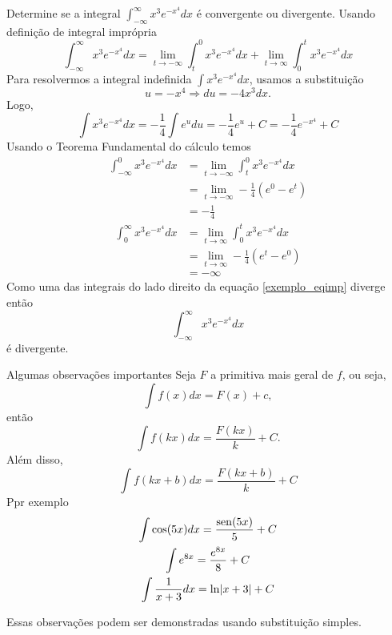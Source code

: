 \begin{example}
  Determine se a integral \(\int_{-\infty}^{\infty} x^3e^{-x^4} dx\)
  é convergente ou divergente.
  \solution
  Usando  definição de integral imprópria
  \begin{equation}
    \label{exemplo_eqimp}
      \int_{-\infty}^{\infty} x^3e^{-x^4} dx
    = \lim_{t \to-\infty} \int_{t}^{0} x^3e^{-x^4} dx
    + \lim_{t \to \infty} \int_{0}^{t} x^3e^{-x^4} dx
  \end{equation}
  Para resolvermos a integral indefinida $\int x^3e^{-x^4} dx$,
  usamos a substituição
  \[
    u=-x^4 \Rightarrow du=-4x^3dx.
  \]
  Logo,
  \[
    \int x^3e^{-x^4} dx
    = -\frac{1}{4}\int e^u du
    = -\frac{1}{4}e^u+C
    = -\frac{1}{4}e^{-x^4}+C
  \]
  Usando o Teorema Fundamental do cálculo temos
  \begin{align*}
    \int_{-\infty}^{0} x^3e^{-x^4} dx
    & = \lim_{t \to -\infty} \int_{t}^{0} x^3e^{-x^4} dx \\
    & = \lim_{t \to -\infty} -\frac{1}{4}\left( e^0-e^t \right) \\
    & =-\frac{1}{4}
  \end{align*}
  \begin{align*}
    \int_{0}^{\infty} x^3e^{-x^4} dx
    & = \lim_{t \to \infty} \int_{0}^{t} x^3e^{-x^4} dx \\
    & = \lim_{t \to \infty} -\frac{1}{4}\left( e^t-e^0 \right) \\
    & =-\infty
  \end{align*}
  Como uma das integrais do lado direito da equação
  \ref{exemplo_eqimp} diverge então
  \[
    \int_{-\infty}^{\infty} x^3e^{-x^4} dx
  \]
  é divergente.
\end{example}

Algumas observações importantes
Seja $F$ a primitiva mais geral de $f$, ou seja,
\[
  \int f(x)dx= F(x)+c,
\]
  então
\[
  \int f(kx) dx= \frac{F(kx)}{k}+C.
\]
Além disso,
\[
  \int f(kx+b)dx= \frac{F(kx+b)}{k}+C
\]
Ppr exemplo
\begin{gather*}
  \int \cos(5x) dx= \frac{\sin(5x)}{5}+C \\
  \int e^{8x}= \frac{e^{8x}}{8}+C        \\
  \int \frac{1}{x+3}dx= \ln\abs{x+3}+C
\end{gather*}

Essas observações podem ser demonstradas usando substituição simples.


